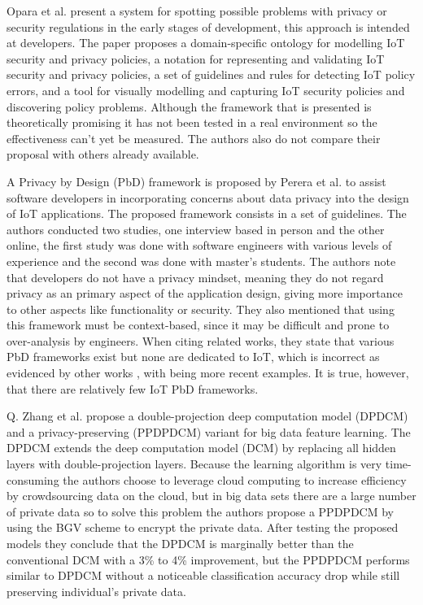 Opara et al. \cite{opara2022framework} present a system for spotting possible
problems with privacy or security regulations in the early stages of development,
this approach is intended at developers. The paper proposes a domain-specific
ontology for modelling IoT security and privacy policies, a notation for
representing and validating IoT security and privacy policies, a set of
guidelines and rules for detecting IoT policy errors, and a tool for visually
modelling and capturing IoT security policies and discovering policy problems.
Although the framework that is presented is theoretically promising it has
not been tested in a real environment so the effectiveness can't yet be
measured. The authors also do not compare their proposal with others already
available.

A Privacy by Design (PbD) framework is proposed by Perera et al. \cite{perera2020designing}
to assist software developers in incorporating concerns about data privacy
into the design of IoT applications. The proposed framework consists in
a set of guidelines. The authors conducted two studies, one interview based
in person and the other online, the first study was done with software engineers with
various levels of experience and the second was done with master's students.
The authors note that developers do not have a privacy mindset, meaning
they do not regard privacy as an primary aspect of the application design,
giving more importance to other aspects like functionality or security.
They also mentioned that using this framework must be context-based, since
it may be difficult and prone to over-analysis by engineers. When citing
related works, they state that various PbD frameworks exist but none are dedicated
to IoT, which is incorrect as evidenced by other works \cite{o2017privacy, cavoukian2016embedding},
with \cite{alkhariji2023semantics, aljeraisy2021privacy} being more recent
examples. It is true, however, that there are relatively few IoT PbD frameworks.

Q. Zhang et al. \cite{zhang2017privacy} propose a double-projection deep
computation model (DPDCM) and a privacy-preserving (PPDPDCM) variant for
big data feature learning. The DPDCM extends the deep computation model
(DCM) by replacing all hidden layers with double-projection layers.
Because the learning algorithm is very time-consuming the authors choose
to leverage cloud computing to increase efficiency by crowdsourcing data
on the cloud, but in big data sets there are a large number of private data
so to solve this problem the authors propose a PPDPDCM by using the BGV
scheme to encrypt the private data. After testing the proposed models
they conclude that the DPDCM is marginally better than the conventional DCM
with a 3\% to 4\% improvement, but the PPDPDCM performs similar to DPDCM
without a noticeable classification accuracy drop while still preserving
individual's private data.

